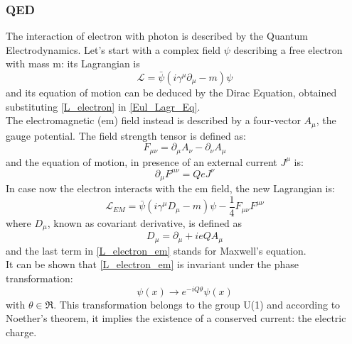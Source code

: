 \subsubsection{QED}\label{QED}
The interaction of electron with photon is described by the Quantum Electrodynamics. 
Let's start with a complex field $\psi$ describing a free electron with mass m: its Lagrangian is
\begin{equation}
\mathcal{L} = \bar{\psi}(i\gamma^{\mu}\partial_{\mu}-m)\psi
\label{L_electron}
\end{equation}
and its equation of motion can be deduced by the Dirac Equation, obtained substituting \ref{L_electron} in \ref{Eul_Lagr_Eq}. \\
The electromagnetic (em)  field instead is described by a four-vector $A_{\mu}$, the gauge potential. The field strength tensor is defined as:
\begin{equation}
F_{\mu\nu} = \partial_{\mu}A_{\nu} - \partial_{\nu}A_{\mu}
\label{F_em}
\end{equation}
and the equation of motion, in presence of an external current $J^{\mu}$ is:
\begin{equation}
\partial_{\mu}F^{\mu\nu} = QeJ^{\nu}
\label{Motion_em}
\end{equation}
In case now the electron interacts with the em field, the new Lagrangian is:
\begin{equation}
\mathcal{L}_{EM} = \bar{\psi}(i\gamma^{\mu}D_{\mu}-m)\psi - \frac{1}{4}F_{\mu\nu}F^{\mu\nu}
\label{L_electron_em}
\end{equation}
where $D_{\mu}$, known as covariant derivative, is defined as
\begin{equation}
D_{\mu} = \partial_{\mu} + ieQA_{\mu}
\label{D_covariante}
\end{equation}
and the last term in \ref{L_electron_em} stands for Maxwell's equation. \\
It can be shown that \ref{L_electron_em} is invariant under the phase transformation:
\begin{equation}
\psi(x)\to e^{-iQ\theta} \psi(x)
\label{global_trans}
\end{equation}
with $\theta \in \Re$. This transformation belongs to the group U(1) and according to Noether's theorem, it implies the existence of a conserved current: the electric charge.
